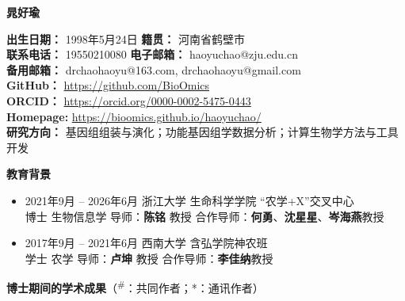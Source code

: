 \cleardoublepage
{}

\begin{flushleft}
    {\Large \textbf{晁好瑜}}
\end{flushleft}

\noindent
\textbf{出生日期：} 1998年5月24日 \quad \textbf{籍贯：} 河南省鹤壁市 \\
\textbf{联系电话：} 19550210080  \quad  \textbf{电子邮箱：} haoyuchao@zju.edu.cn \\
\textbf{备用邮箱：} drchaohaoyu@163.com, drchaohaoyu@gmail.com \\
\textbf{GitHub：} \url{https://github.com/BioOmics} \\
\textbf{ORCID：} \url{https://orcid.org/0000-0002-5475-0443} \\
\textbf{Homepage: } \url{https://bioomics.github.io/haoyuchao/} \\
\textbf{研究方向：} 基因组组装与演化；功能基因组学数据分析；计算生物学方法与工具开发

\vspace{0.2em}

\noindent
\textbf{教育背景}

\begin{itemize}[leftmargin=*, itemsep=0pt, parsep=0pt, topsep=0pt]
    \item 2021年9月 -- 2026年6月 \quad 浙江大学 \quad 生命科学学院 \quad “农学+X”交叉中心 \\
    博士 \quad 生物信息学 \quad 导师：\textbf{陈铭} 教授 \quad 合作导师：\textbf{何勇}、\textbf{沈星星}、\textbf{岑海燕}教授

    \item 2017年9月 -- 2021年6月 \quad 西南大学 \quad 含弘学院神农班 \\
    学士 \quad 农学 \quad 导师：\textbf{卢坤} 教授 \quad 合作导师：\textbf{李佳纳}教授
\end{itemize}

\vspace{0.2em}

\noindent
\textbf{博士期间的学术成果}（\textsuperscript{\#}：共同作者；*：通讯作者）

